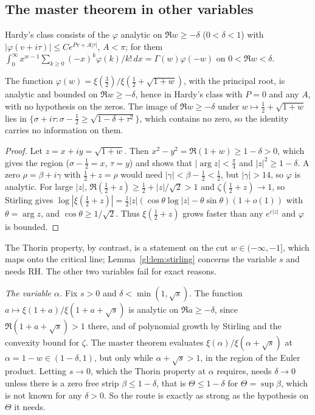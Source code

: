\subsection{The master theorem in other variables}\label{tx:sec:vars}

Hardy's class consists of the $\varphi$ analytic on $\Re w\ge-\delta$ ($0<\delta<1$) with $|\varphi(v+i\tau)|\le Ce^{Pv+A|\tau|}$, $A<\pi$; for them $\int_0^\infty x^{w-1}\sum_{k\ge0}(-x)^k\varphi(k)/k!\,dx=\Gamma(w)\varphi(-w)$ on $0<\Re w<\delta$.

\begin{proposition}\label{tx:prop:hardy}
The function $\varphi(w)=\xi(\tfrac32)/\xi(\tfrac12+\sqrt{1+w})$, with the principal root, is analytic and bounded on $\Re w\ge-\delta$, hence in Hardy's class with $P=0$ and any $A$, with no hypothesis on the zeros. The image of $\Re w\ge-\delta$ under $w\mapsto\frac12+\sqrt{1+w}$ lies in $\{\sigma+i\tau:\sigma-\frac12\ge\sqrt{1-\delta+\tau^2}\}$, which contains no zero, so the identity carries no information on them.
\end{proposition}

\begin{proof}
Let $z=x+iy=\sqrt{1+w}$. Then $x^2-y^2=\Re(1+w)\ge1-\delta>0$, which gives the region ($\sigma-\frac12=x$, $\tau=y$) and shows that $|\arg z|<\frac\pi4$ and $|z|^2\ge1-\delta$. A zero $\rho=\beta+i\gamma$ with $\frac12+z=\rho$ would need $|\gamma|<\beta-\frac12<\frac12$, but $|\gamma|>14$, so $\varphi$ is analytic. For large $|z|$, $\Re(\frac12+z)\ge\frac12+|z|/\sqrt2>1$ and $\zeta(\frac12+z)\to1$, so Stirling gives $\log|\xi(\frac12+z)|=\frac12|z|(\cos\theta\log|z|-\theta\sin\theta)(1+o(1))$ with $\theta=\arg z$, and $\cos\theta\ge1/\sqrt2$. Thus $\xi(\frac12+z)$ grows faster than any $e^{c|z|}$ and $\varphi$ is bounded.
\end{proof}

The Thorin property, by contrast, is a statement on the cut $w\in(-\infty,-1]$, which maps onto the critical line; Lemma~\ref{gl:lem:stirling} concerns the variable $s$ and needs RH. The other two variables fail for exact reasons.

\emph{The variable $\alpha$.} Fix $s>0$ and $\delta<\min(1,\sqrt s)$. The function $a\mapsto\xi(1+a)/\xi(1+a+\sqrt s)$ is analytic on $\Re a\ge-\delta$, since $\Re(1+a+\sqrt s)>1$ there, and of polynomial growth by Stirling and the convexity bound for $\zeta$. The master theorem evaluates $\xi(\alpha)/\xi(\alpha+\sqrt s)$ at $\alpha=1-w\in(1-\delta,1)$, but only while $\alpha+\sqrt s>1$, in the region of the Euler product. Letting $s\to0$, which the Thorin property at $\alpha$ requires, needs $\delta\to0$ unless there is a zero free strip $\beta\le1-\delta$, that is $\Theta\le1-\delta$ for $\Theta=\sup\beta$, which is not known for any $\delta>0$. So the route is exactly as strong as the hypothesis on $\Theta$ it needs.

